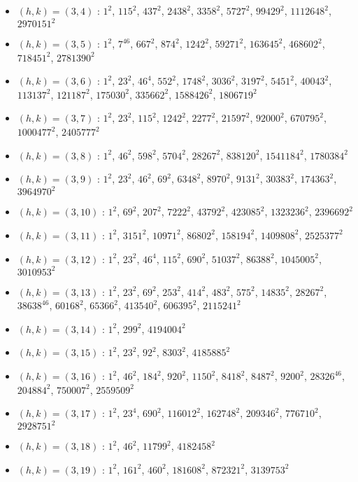 \begin{itemize}
\item $(h,k)=(3,4)$ : $1^{2}$, $115^{2}$, $437^{2}$, $2438^{2}$, $3358^{2}$, $5727^{2}$, $99429^{2}$, $1112648^{2}$, $2970151^{2}$
\item $(h,k)=(3,5)$ : $1^{2}$, $7^{46}$, $667^{2}$, $874^{2}$, $1242^{2}$, $59271^{2}$, $163645^{2}$, $468602^{2}$, $718451^{2}$, $2781390^{2}$
\item $(h,k)=(3,6)$ : $1^{2}$, $23^{2}$, $46^{4}$, $552^{2}$, $1748^{2}$, $3036^{2}$, $3197^{2}$, $5451^{2}$, $40043^{2}$, $113137^{2}$, $121187^{2}$, $175030^{2}$, $335662^{2}$, $1588426^{2}$, $1806719^{2}$
\item $(h,k)=(3,7)$ : $1^{2}$, $23^{2}$, $115^{2}$, $1242^{2}$, $2277^{2}$, $21597^{2}$, $92000^{2}$, $670795^{2}$, $1000477^{2}$, $2405777^{2}$
\item $(h,k)=(3,8)$ : $1^{2}$, $46^{2}$, $598^{2}$, $5704^{2}$, $28267^{2}$, $838120^{2}$, $1541184^{2}$, $1780384^{2}$
\item $(h,k)=(3,9)$ : $1^{2}$, $23^{2}$, $46^{2}$, $69^{2}$, $6348^{2}$, $8970^{2}$, $9131^{2}$, $30383^{2}$, $174363^{2}$, $3964970^{2}$
\item $(h,k)=(3,10)$ : $1^{2}$, $69^{2}$, $207^{2}$, $7222^{2}$, $43792^{2}$, $423085^{2}$, $1323236^{2}$, $2396692^{2}$
\item $(h,k)=(3,11)$ : $1^{2}$, $3151^{2}$, $10971^{2}$, $86802^{2}$, $158194^{2}$, $1409808^{2}$, $2525377^{2}$
\item $(h,k)=(3,12)$ : $1^{2}$, $23^{2}$, $46^{4}$, $115^{2}$, $690^{2}$, $51037^{2}$, $86388^{2}$, $1045005^{2}$, $3010953^{2}$
\item $(h,k)=(3,13)$ : $1^{2}$, $23^{2}$, $69^{2}$, $253^{2}$, $414^{2}$, $483^{2}$, $575^{2}$, $14835^{2}$, $28267^{2}$, $38638^{46}$, $60168^{2}$, $65366^{2}$, $413540^{2}$, $606395^{2}$, $2115241^{2}$
\item $(h,k)=(3,14)$ : $1^{2}$, $299^{2}$, $4194004^{2}$
\item $(h,k)=(3,15)$ : $1^{2}$, $23^{2}$, $92^{2}$, $8303^{2}$, $4185885^{2}$
\item $(h,k)=(3,16)$ : $1^{2}$, $46^{2}$, $184^{2}$, $920^{2}$, $1150^{2}$, $8418^{2}$, $8487^{2}$, $9200^{2}$, $28326^{46}$, $204884^{2}$, $750007^{2}$, $2559509^{2}$
\item $(h,k)=(3,17)$ : $1^{2}$, $23^{4}$, $690^{2}$, $116012^{2}$, $162748^{2}$, $209346^{2}$, $776710^{2}$, $2928751^{2}$
\item $(h,k)=(3,18)$ : $1^{2}$, $46^{2}$, $11799^{2}$, $4182458^{2}$
\item $(h,k)=(3,19)$ : $1^{2}$, $161^{2}$, $460^{2}$, $181608^{2}$, $872321^{2}$, $3139753^{2}$

\end{itemize}
